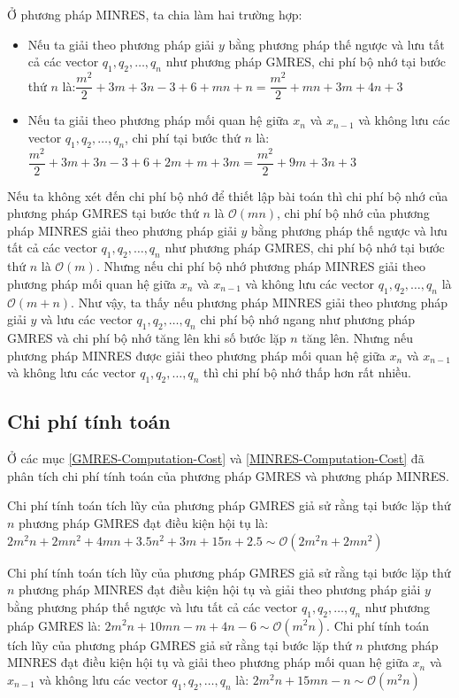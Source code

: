 \documentclass[14pt, a4paper]{article}
\numberwithin{equation}{section}
\numberwithin{algorithm}{section}
\numberwithin{figure}{section}
\numberwithin{dl}{section}
\numberwithin{md}{section}
\numberwithin{bd}{section}
\numberwithin{dn}{section}
\begin{document}
Ở phương pháp MINRES, ta chia làm hai trường hợp:

\begin{itemize}
    \item Nếu ta giải theo phương pháp giải $y$ bằng phương pháp thế ngược và lưu tất cả các vector $q_1, q_2, \dots, q_n$ như phương pháp GMRES, chi phí bộ nhớ tại bước thứ $n$ là:$\dfrac{m^2}{2}+3m + 3n-3+6+mn+n=\dfrac{m^2}{2}+mn+3m+4n+3$
    \item Nếu ta giải theo phương pháp mối quan hệ giữa $x_n$ và $x_{n-1}$ và không lưu các vector $q_1, q_2, \dots, q_n$, chi phí tại bước thứ $n$ là: $\dfrac{m^2}{2}+3m + 3n-3+6+2m + m + 3m=\dfrac{m^2}{2}+9m+3n+3$
\end{itemize}

Nếu ta không xét đến chi phí bộ nhớ để thiết lập bài toán thì chi phí bộ nhớ của phương pháp GMRES tại bước thứ $n$ là $\mathcal{O}(mn)$, chi phí bộ nhớ của phương pháp MINRES giải theo phương pháp giải $y$ bằng phương pháp thế ngược và lưu tất cả các vector $q_1, q_2, \dots, q_n$ như phương pháp GMRES, chi phí bộ nhớ tại bước thứ $n$ là $\mathcal{O}(m)$. Nhưng nếu chi phí bộ nhớ phương pháp MINRES giải theo phương pháp mối quan hệ giữa $x_n$ và $x_{n-1}$ và không lưu các vector $q_1, q_2, \dots, q_n$ là $\mathcal{O}(m+n)$. Như vậy, ta thấy nếu phương pháp MINRES giải theo phương pháp giải $y$ và lưu các vector $q_1, q_2, \dots, q_n$ chi phí bộ nhớ ngang như phương pháp GMRES và chi phí bộ nhớ tăng lên khi số bước lặp $n$ tăng lên.
Nhưng nếu phương pháp MINRES được giải theo phương pháp mối quan hệ giữa $x_n$ và $x_{n-1}$ và không lưu các vector $q_1, q_2, \dots, q_n$ thì chi phí bộ nhớ thấp hơn rất nhiều.

\subsection{Chi phí tính toán}

Ở các mục \ref{GMRES-Computation-Cost} và \ref{MINRES-Computation-Cost} đã phân tích chi phí tính toán của phương pháp GMRES và phương pháp MINRES.

Chi phí tính toán tích lũy của phương pháp GMRES giả sử rằng tại bước lặp thứ $n$ phương pháp GMRES đạt điều kiện hội tụ là: $2m^2 n + 2mn^2+4mn+3.5n^2+3m+15n+2.5 \sim \mathcal{O}(2m^2n+ 2mn^2)$

Chi phí tính toán tích lũy của phương pháp GMRES giả sử rằng tại bước lặp thứ $n$ phương pháp MINRES đạt điều kiện hội tụ và giải theo phương pháp giải $y$ bằng phương pháp thế ngược và lưu tất cả các vector $q_1, q_2, \dots, q_n$ như phương pháp GMRES là: $2m^2n+10mn-m+4n-6 \sim \mathcal{O}(m^2n)$.
Chi phí tính toán tích lũy của phương pháp GMRES giả sử rằng tại bước lặp thứ $n$ phương pháp MINRES đạt điều kiện hội tụ và giải theo phương pháp mối quan hệ giữa $x_n$ và $x_{n-1}$ và không lưu các vector $q_1, q_2, \dots, q_n$ là: $2m^2n+15mn-n \sim \mathcal{O}(m^2n)$
\end{document}
